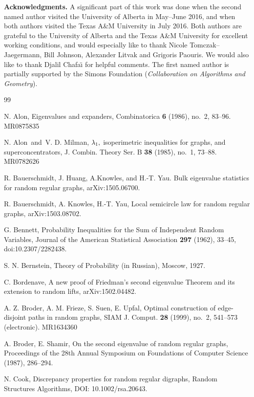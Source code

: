 \documentclass[12pt]{article}
\theoremstyle{definition}
\theoremstyle{plain}
\begin{document}
\bigskip

{\bf Acknowledgments.}
A significant part of this work was done when the second named author visited
the University of Alberta in May--June 2016, and when both authors visited
the Texas A\&M University in July 2016. Both authors are grateful to the University of Alberta
and the Texas A\&M University for excellent working conditions, and would especially like to thank
Nicole Tomczak--Jaegermann, Bill Johnson, Alexander Litvak and Grigoris Paouris. 
We would also like to thank Djalil Chafa\"{\i} for helpful comments. 
The first named author is partially supported by the Simons Foundation ({\it{}Collaboration on Algorithms and Geometry}).

\begin{thebibliography}{99}

{
N. Alon, Eigenvalues and expanders, Combinatorica {\bf 6} (1986), no.~2, 83--96. MR0875835
}

{
N. Alon\ and\ V. D. Milman, $\lambda\sb 1,$ isoperimetric inequalities for graphs, and superconcentrators,
J. Combin. Theory Ser. B {\bf 38} (1985), no.~1, 73--88. MR0782626
}

{
R. Bauerschmidt, J. Huang, A.Knowles, and H.-T. Yau. Bulk eigenvalue statistics for random regular graphs, arXiv:1505.06700.
}

{
R. Bauerschmidt, A. Knowles, H.-T. Yau,
Local semicircle law for random regular graphs,
arXiv:1503.08702.
}

{
G. Bennett, Probability Inequalities for the Sum of Independent Random Variables,
Journal of the American Statistical Association {\bf 297} (1962), 33--45, doi:10.2307/2282438.
}

{
S. N. Bernstein, Theory of Probability (in Russian), Moscow, 1927.
}

{
C. Bordenave,
A new proof of Friedman's second eigenvalue Theorem and its extension to random lifts,
arXiv:1502.04482.
}

{
A. Z. Broder, A. M. Frieze, S. Suen, E. Upfal, Optimal construction of edge-disjoint paths in random graphs,
SIAM J. Comput. {\bf 28} (1999), no.~2, 541--573 (electronic). MR1634360
}

{
A. Broder, E. Shamir, On the second eigenvalue of random regular graphs,
Proceedings of the 28th Annual Symposium on Foundations of Computer Science (1987), 286--294.
}

{
N. Cook, Discrepancy properties for random regular digraphs, Random Structures Algorithms,
DOI: 10.1002/rsa.20643.
}


\end{thebibliography}
\end{document}
